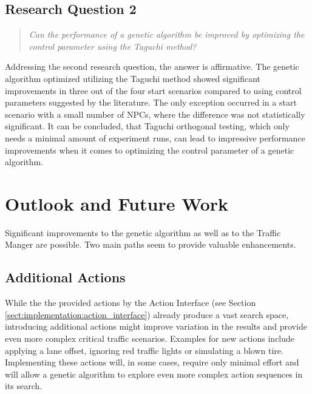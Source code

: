\subsection{Research Question 2}
\begin{quote}
	\begin{em}
		\textit{Can the performance of a genetic algorithm be improved by optimizing the control parameter using the Taguchi method?}
	\end{em}
\end{quote}

Addressing the second research question, the answer is affirmative. The genetic algorithm optimized utilizing the Taguchi method showed significant improvements in three out of the four start scenarios compared to using control parameters suggested by the literature. The only exception occurred in a start scenario with a small number of NPCs, where the difference was not statistically significant. It can be concluded, that Taguchi orthogonal testing, which only needs a minimal amount of experiment runs, can lead to impressive performance improvements when it comes to optimizing the control parameter of a genetic algorithm.

\section{Outlook and Future Work}
Significant improvements to the genetic algorithm as well as to the Traffic Manger are possible. Two main paths seem to provide valuable enhancements.

\subsection{Additional Actions}
While the the provided actions by the Action Interface (see Section \ref{sect:implementation:action_interface}) already produce a vast search space, introducing additional actions might improve variation in the results and provide even more complex critical traffic scenarios. Examples for new actions include applying a lane offset, ignoring red traffic lights or simulating a blown tire. Implementing these actions will, in some cases, require only minimal effort and will allow a genetic algorithm to explore even more complex action sequences in its search.

